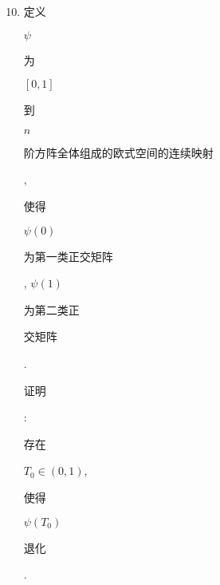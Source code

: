 \documentclass[10pt]{article}
\begin{document}
\begin{enumerate}
  \setcounter{enumi}{9}
  \item \begin{CJK}{UTF8}{mj}定义\end{CJK} $\psi$ \begin{CJK}{UTF8}{mj}为\end{CJK} $[0,1]$ \begin{CJK}{UTF8}{mj}到\end{CJK} $n$ \begin{CJK}{UTF8}{mj}阶方阵全体组成的欧式空间的连续映射\end{CJK}, \begin{CJK}{UTF8}{mj}使得\end{CJK} $\psi(0)$ \begin{CJK}{UTF8}{mj}为第一类正交矩阵\end{CJK}, $\psi(1)$ \begin{CJK}{UTF8}{mj}为第二类正\end{CJK} \begin{CJK}{UTF8}{mj}交矩阵\end{CJK}. \begin{CJK}{UTF8}{mj}证明\end{CJK}: \begin{CJK}{UTF8}{mj}存在\end{CJK} $T_{0} \in(0,1)$, \begin{CJK}{UTF8}{mj}使得\end{CJK} $\psi\left(T_{0}\right)$ \begin{CJK}{UTF8}{mj}退化\end{CJK}.


\end{enumerate}
\end{document}
